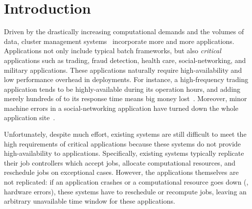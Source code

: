 \section{Introduction} \label{sec:intro}

Driven by the drastically increasing computational demands and the volumes of 
data, cluster 
management systems~\cite{borg:eurosys15,mesos:nsdi11,tupperware,yarn:socc13,
autopilot:sosp07,quincy:sosp09,apollo:osdi14,fuxi:vldb14} 
incorporate more and more applications. Applications not only include typical 
batch frameworks, but also \emph{critical} applications such as trading, fraud 
detection, health care, social-networking, and military applications. These 
applications naturally require high-availability and low performance overhead in 
deployments. For instance, a high-frequency trading application tends to be 
highly-available during its operation hours, and adding merely hundreds of \us 
to its response time means big money lost~\cite{nosql:finance}. Moreover, minor 
machine errors in a social-networking application have turned down the 
whole application site~\cite{facebook:outage}.



Unfortunately, despite much effort, existing systems are still difficult to 
meet the high requirements of critical applications because these systems do 
not provide high-availability to applications. Specifically, existing 
systems typically replicate their job controllers which accept jobs, 
allocate computational resources, and reschedule jobs on exceptional cases. 
However, the applications themselves are not replicated: if an application 
crashes or a computational resource goes down (\eg, hardware errors), these 
systems have to reschedule or recompute jobs, leaving an arbitrary 
unavailable time window for these applications.

